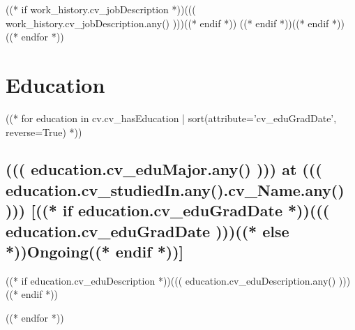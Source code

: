 \documentclass[10pt]{article}
\begin{document}
((* if work_history.cv_jobDescription *))((( work_history.cv_jobDescription.any() )))((* endif *))
((* endif *))((* endif *))
((* endfor *))


\section*{Education}

((* for education in cv.cv_hasEducation | sort(attribute='cv_eduGradDate', reverse=True) *))

\subsection*{((( education.cv_eduMajor.any() ))) at ((( education.cv_studiedIn.any().cv_Name.any() ))) [((* if education.cv_eduGradDate *))((( education.cv_eduGradDate )))((* else *))Ongoing((* endif *))]}

((* if education.cv_eduDescription *))((( education.cv_eduDescription.any() )))((* endif *))

((* endfor *))
\end{document}
